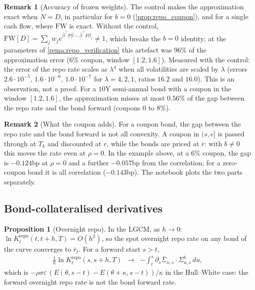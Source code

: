 \documentclass[11pt,english]{amsart}
\theoremstyle{definition}
\newtheorem{prop}{Proposition}
\newtheorem{rema}{Remark}
\begin{document}
\begin{rema}[Accuracy of frozen weights]\label{rema:repo_frozen}
The control makes the approximation exact when $N = D$, in particular for $b = 0$ (\autoref{prop:repo_coupon}), and for a single cash flow, where $\mathrm{FW}$ is exact. Without the control, $\mathrm{FW}[D] = \sum_j w_j e^{\bar\beta^\top P\bar\beta - \bar\beta^\top P\beta_j} \neq 1$, which breaks the $b=0$ identity; at the parameters of \autoref{rema:repo_verification} this artefact was $96\%$ of the approximation error (6\% coupon, window $[1.2,1.6]$). Measured with the control: the error of the repo rate scales as $\lambda^4$ when all volatilities are scaled by $\lambda$ (errors $2.6\cdot10^{-5}$, $1.6\cdot10^{-6}$, $1.0\cdot10^{-7}$ for $\lambda = 4, 2, 1$, ratios $16.2$ and $16.0$). This is an observation, not a proof. For a $10$Y semi-annual bond with a coupon in the window $[1.2,1.6]$, the approximation misses at most $0.56\%$ of the gap between the repo rate and the bond forward (coupons $0$ to $8\%$).
\end{rema}

\begin{rema}[What the coupon adds]
For a coupon bond, the gap between the repo rate and the bond forward is not all convexity. A coupon in $(s,e]$ is passed through at $T_k$ and discounted at $r$, while the bonds are priced at $\bar r$: with $b \neq 0$ this moves the rate even at $\rho = 0$. In the example above, at a $6\%$ coupon, the gap is $-0.124$bp at $\rho = 0$ and a further $-0.057$bp from the correlation; for a zero-coupon bond it is all correlation ($-0.143$bp). The notebook plots the two parts separately.
\end{rema}

\subsection{Bond-collateralised derivatives}

\begin{prop}[Overnight repo]\label{prop:repo_overnight}
In the LGCM, as $h\to0$: $\ln K^{\mathrm{repo}}_t(t,t+h,T) = O(h^2)$, so the spot overnight repo rate on any bond of the curve converges to $\bar r_t$. For a forward start $s>t$,
\begin{eqnarray}
	\frac1h \ln K^{\mathrm{repo}}_t(s,s+h,T) &\to& -\int_t^s \partial_s\bar\Sigma_{u,s}\cdot\Sigma^b_{u,s}\,du ,
\end{eqnarray}
which is $-\rho\sigma\varepsilon\,(E(\theta,s-t)-E(\theta+\kappa,s-t))/\kappa$ in the Hull--White case: the forward overnight repo rate is not the bond forward rate.
\end{prop}
\end{document}
